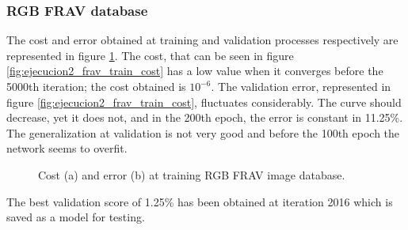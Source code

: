 \subsubsection{RGB FRAV database}
The cost and error obtained at training and validation processes respectively are represented in figure \ref{fig:ejecucion2_frav_train}. The cost, that can be seen in figure \ref{fig:ejecucion2_frav_train_cost} has a low value when it converges before the 5000th iteration; the cost obtained is $10^{-6}$. The validation error, represented in figure \ref{fig:ejecucion2_frav_train_cost}, fluctuates considerably. The curve should decrease, yet it does not, and in the 200th epoch, the error is constant in 11.25\%. The generalization at validation is not very good and before the 100th epoch the network seems to overfit.\\
\begin{figure}[htb]
\centering
\caption{Cost (a) and error (b) at training RGB FRAV image database.}
\label{fig:ejecucion2_frav_train}
\end{figure}

The best validation score of 1.25\% has been obtained at iteration 2016 which is saved as a model for testing.

